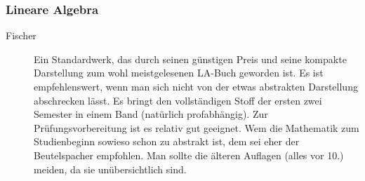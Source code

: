 \subsubsection*{Lineare Algebra}
\begin{description}
\item[Fischer]{
		Ein Standardwerk, das durch seinen günstigen Preis und seine kompakte Darstellung zum wohl meistgelesenen LA-Buch geworden ist. Es ist empfehlenswert, wenn man sich nicht von der etwas abstrakten Darstellung abschrecken lässt. Es bringt den vollständigen Stoff der ersten zwei Semester in einem Band (natürlich profabhängig). Zur Prüfungsvorbereitung ist es relativ gut geeignet. Wem die Mathematik zum Studienbeginn sowieso schon zu abstrakt ist, dem sei eher der Beutelspacher empfohlen. Man sollte die älteren Auflagen (alles vor 10.) meiden, da sie unübersichtlich sind.}






\end{description}
